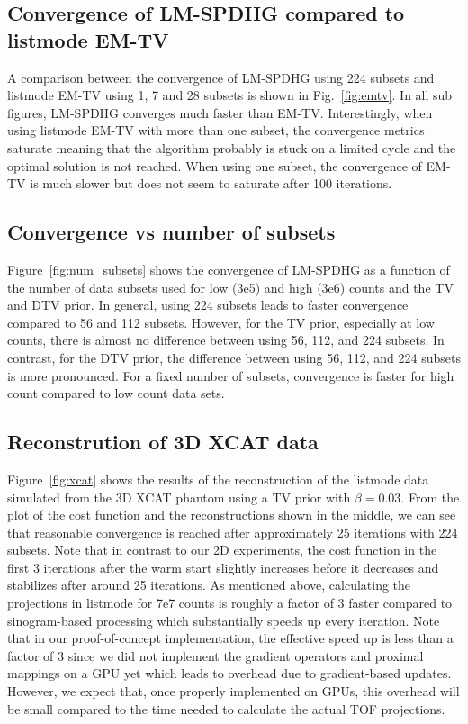 \subsection*{Convergence of LM-SPDHG compared to listmode EM-TV}

A comparison between the convergence of LM-SPDHG using 224 subsets and listmode 
EM-TV using 1, 7 and 28 subsets is shown in Fig.~\ref{fig:emtv}.
In all sub figures, LM-SPDHG converges much faster than EM-TV.
Interestingly, when using listmode EM-TV with more than one subset, the convergence
metrics saturate meaning that the algorithm probably is stuck
on a limited cycle and the optimal solution is not reached.
When using one subset, the convergence of EM-TV is much slower but does not seem
to saturate after 100 iterations.


\subsection*{Convergence vs number of subsets}

Figure~\ref{fig:num_subsets} shows the convergence of LM-SPDHG as a function of the number of data
subsets used for low (3e5) and high (3e6) counts and the TV and DTV prior.
In general, using 224 subsets leads to faster convergence compared to 56 and 112 subsets.
However, for the TV prior, especially at low counts, there is almost no difference between using
56, 112, and 224 subsets.
In contrast, for the DTV prior, the difference between using 56, 112, and 224 subsets is more
pronounced.
For a fixed number of subsets, convergence is faster for high count compared to low count data sets.


\subsection*{Reconstrution of 3D XCAT data}

Figure~\ref{fig:xcat} shows the results of the reconstruction of the listmode data simulated
from the 3D XCAT phantom using a TV prior with $\beta = 0.03$. 
From the plot of the cost function and the reconstructions shown in the middle, we can see
that reasonable convergence is reached after approximately 25 iterations with 224 subsets.
Note that in contrast to our 2D experiments, the cost function in the first 3 iterations after
the warm start slightly increases before it decreases and stabilizes after around 25 iterations.
As mentioned above, calculating the projections in listmode for 7e7 counts is roughly a factor
of 3 faster compared to sinogram-based processing which substantially speeds up every iteration.
Note that in our proof-of-concept implementation, the effective speed up is less than a 
factor of 3 since we did not implement the gradient operators and proximal mappings on a GPU yet
which leads to overhead due to gradient-based updates.
However, we expect that, once properly implemented on GPUs, this overhead will be small compared to
the time needed to calculate the actual TOF projections.


